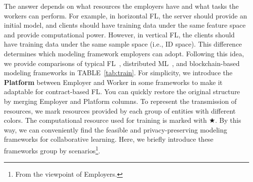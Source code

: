 The answer depends on what resources the employers have and what tasks the workers can perform.
For example, in horizontal FL, the server should provide an initial model, and clients should have training data under the same feature space and provide computational power. However, in vertical FL, the clients should have training data under the same sample space (i.e., ID space). 
This difference determines which modeling framework employers can adopt. 
Following this idea, we provide comparisons of typical FL~\cite{mcmahan2017communication}, distributed ML~\cite{ryabinin2021moshpit}, and blockchain-based~\cite{mcconaghy2022ocean} modeling frameworks in TABLE~\ref{tab:train}.
For simplicity, we introduce the \textbf{Platform} between Employer and Worker in some frameworks to make it adaptable for contract-based FL. 
You can quickly restore the original structure by merging Employer and Platform columns.
To represent the transmission of resources, we mark resources provided by each group of entities with different colors.
The computational resource used for training is marked with $\bigstar$.
By this way, we can conveniently find the feasible and privacy-preserving modeling frameworks for collaborative learning. 
Here, we briefly introduce these frameworks group by scenarios\footnote{From the viewpoint of Employers.}.

